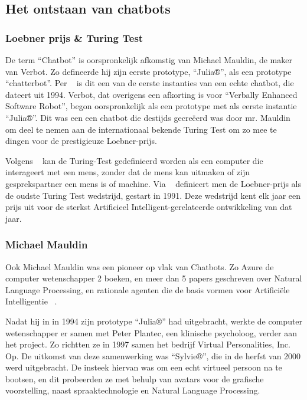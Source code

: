  

\subsection{Het ontstaan van chatbots}
\subsubsection{Loebner prijs \& Turing Test}
De term “Chatbot” is oorspronkelijk afkomstig van Michael Mauldin, de maker van Verbot. Zo defineerde hij zijn eerste prototype, “Julia®”, als een prototype “chatterbot”. Per ~\cite{Vlahos2019} is dit een van de eerste instanties van een echte chatbot, die dateert uit 1994. 
Verbot, dat overigens een afkorting is voor “Verbally Enhanced Software Robot”, begon oorspronkelijk als een prototype met als eerste instantie “Julia®”. Dit was een een chatbot die destijds gecreëerd was door mr. Mauldin om deel te nemen aan de internationaal bekende Turing Test om zo mee te dingen voor de prestigieuze Loebner-prijs. 

Volgens ~\cite{Moor2012} kan de Turing-Test gedefinieerd worden als een computer die interageert met een mens, zonder dat de mens kan uitmaken of zijn gesprekspartner een mens is of machine. Via ~\cite{ONeill2016} definieert men de Loebner-prijs als de oudste Turing Test wedstrijd, gestart in 1991. Deze wedstrijd kent elk jaar een prijs uit voor de sterkst Artificieel Intelligent-gerelateerde ontwikkeling van dat jaar. 

\subsubsection{Michael Mauldin}
Ook Michael Mauldin was een pioneer op vlak van Chatbots. Zo Azure de computer wetenschapper 2 boeken, en meer dan 5 papers geschreven over Natural Language Processing, en rationale agenten die de basis vormen voor Artificiële Intelligentie ~\cite{Vlahos2019}. 

Nadat hij in in 1994 zijn prototype “Julia®” had uitgebracht, werkte de computer wetenschapper er samen met Peter Plantec, een klinische psycholoog, verder aan het project. Zo richtten ze in 1997 samen het bedrijf Virtual Personalities, Inc. Op. De uitkomst van deze samenwerking was “Sylvie®”, die in de herfst van 2000 werd uitgebracht. De insteek hiervan was om een echt virtueel persoon na te bootsen, en dit probeerden ze met behulp van avatars voor de grafische voorstelling, naast spraaktechnologie en Natural Language Processing.

